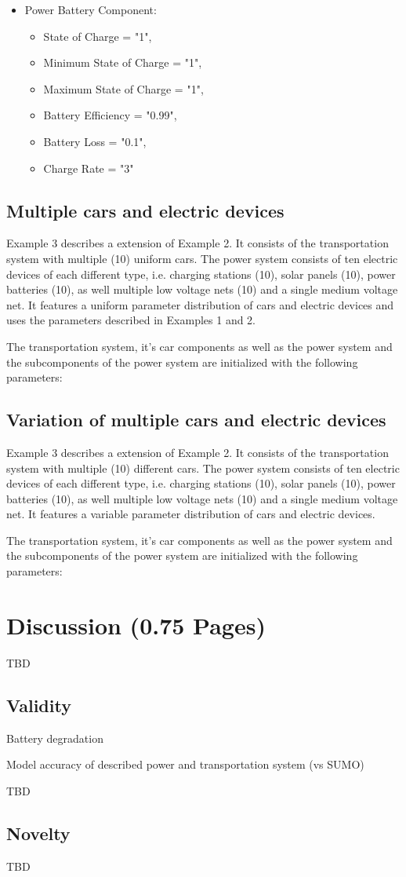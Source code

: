 \begin{itemize}
	\item Power Battery Component:
	\begin{itemize}
		\item State of Charge = "1",
		\item Minimum State of Charge = "1",
		\item Maximum State of Charge = "1", 
		\item Battery Efficiency = "0.99",
		\item Battery Loss = "0.1",
		\item Charge Rate = "3"
	\end{itemize}	
	
\end{itemize}


\subsection{Multiple cars and electric devices}
Example 3 describes a extension of Example 2. It consists of the transportation system with multiple (10) uniform cars.
The power system consists of ten electric devices of each different type, i.e. charging stations (10), solar panels (10), power batteries (10), as well multiple low voltage nets (10) and a single medium voltage net.
It features a uniform parameter distribution of cars and electric devices and uses the parameters described in Examples 1 and 2.

The transportation system, it's car components as well as the power system and the subcomponents of the power system are initialized with the following parameters:

\subsection{Variation of multiple cars and electric devices}
Example 3 describes a extension of Example 2. It consists of the transportation system with multiple (10) different cars.
The power system consists of ten electric devices of each different type, i.e. charging stations (10), solar panels (10), power batteries (10), as well multiple low voltage nets (10) and a single medium voltage net.
It features a variable parameter distribution of cars and electric devices.

The transportation system, it's car components as well as the power system and the subcomponents of the power system are initialized with the following parameters:

\section{Discussion (0.75 Pages)}
\label{section:discussion}

TBD

\subsection{Validity}

Battery degradation

Model accuracy of described power and transportation system (vs SUMO)

TBD

\subsection{Novelty}

TBD